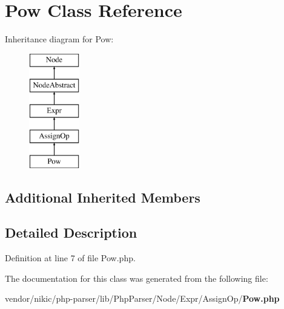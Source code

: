 \section{Pow Class Reference}
\label{class_php_parser_1_1_node_1_1_expr_1_1_assign_op_1_1_pow}
Inheritance diagram for Pow\+:\begin{figure}[H]
\begin{center}
\leavevmode
\includegraphics[height=5.000000cm]{class_php_parser_1_1_node_1_1_expr_1_1_assign_op_1_1_pow}
\end{center}
\end{figure}
\subsection*{Additional Inherited Members}


\subsection{Detailed Description}


Definition at line 7 of file Pow.\+php.



The documentation for this class was generated from the following file\+:\begin{DoxyCompactItemize}
\item 
vendor/nikic/php-\/parser/lib/\+Php\+Parser/\+Node/\+Expr/\+Assign\+Op/{\bf Pow.\+php}\end{DoxyCompactItemize}

